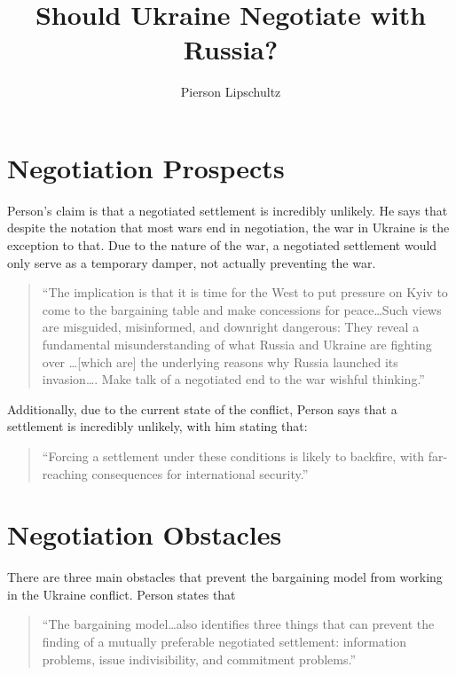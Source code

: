 \documentclass{article}
\title{Should Ukraine Negotiate with Russia?}
\author{Pierson Lipschultz}
\begin{document}
\maketitle

\section{Negotiation Prospects}
    Person's claim is that a negotiated settlement is incredibly unlikely. He says that despite the notation that most wars end in negotiation, the war in Ukraine is the exception to that. Due to the nature of the war, a negotiated settlement would only serve as a temporary damper, not actually preventing the war.

    \begin{quote} \label{}
       ``The implication is that it is time for the West to put pressure on Kyiv to come to the bargaining table and make concessions for peace\ldots Such views are misguided, misinformed, and downright dangerous: They reveal a fundamental misunderstanding of what Russia and Ukraine are fighting over \ldots [which are] the underlying reasons why Russia launched its invasion\ldots. Make talk of a negotiated end to the war wishful thinking.'' \parencite{person_2025}
    \end{quote}

    Additionally, due to the current state of the conflict, Person says that a settlement is incredibly unlikely, with him stating that:

    \begin{quote}
        ``Forcing a settlement under these conditions is likely to backfire, with far-reaching consequences for international security.'' \parencite{person_2025}
    \end{quote}

\section{Negotiation Obstacles}

    There are three main obstacles that prevent the bargaining model from working in the Ukraine conflict. Person states that 
    \begin{quote}
        ``The bargaining model\ldots also identifies three things that can prevent the finding of a mutually preferable negotiated settlement: information problems, issue indivisibility, and commitment problems.'' ~\parencite{person_2025}
    \end{quote}
\end{document}

